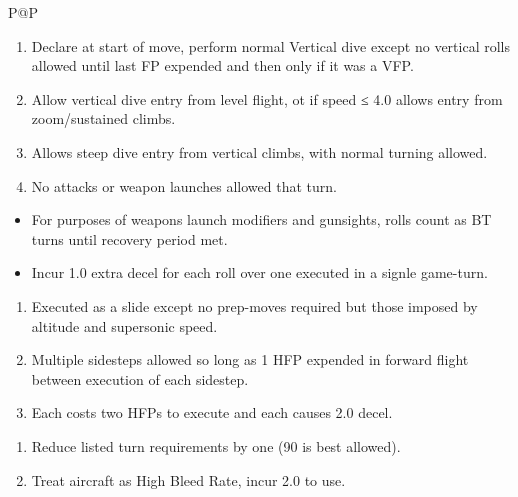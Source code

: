\begin{twocolumntablefloat}
\begin{twocolumntable}
\begin{tabularx}{\linewidth}{P@{\hspace{1em}}P}

            \begin{enumerate}[nosep]
                \item Declare at start of move, perform normal Vertical dive except no vertical rolls allowed until last FP expended and then only if it was a VFP.
                \item Allow vertical dive entry from level flight, ot if speed ≤ 4.0 allows entry from zoom/sustained climbs.
                \item Allows steep dive entry from vertical climbs, with normal turning allowed.
                \item No attacks or weapon launches allowed that turn.
            \end{enumerate}

            \begin{itemize}[nosep]
                \item For purposes of weapons launch modifiers and gunsights, rolls count as BT turns until recovery period met.
                \item Incur 1.0 extra decel for each roll over one executed in a signle game-turn.
            \end{itemize}



            \begin{enumerate}[nosep]
                \item Executed as a slide except no prep-moves required but those imposed by altitude and supersonic speed.
                \item Multiple sidesteps allowed so long as 1 HFP expended in forward flight between execution of each sidestep.
                \item Each costs two HFPs to execute and each causes 2.0 decel.
            \end{enumerate}


            \begin{enumerate}[nosep]
                \item Reduce listed turn requirements by one (90 is best allowed).
                \item Treat aircraft as High Bleed Rate, incur 2.0 to use.
            \end{enumerate}


\end{tabularx}
\end{twocolumntable}
\end{twocolumntablefloat}
